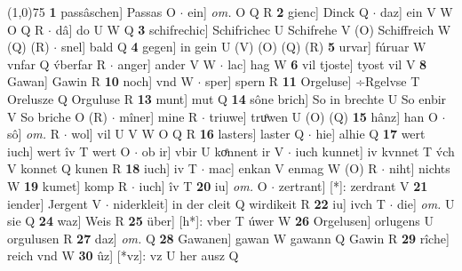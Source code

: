 \documentclass[8pt,a4paper,notitlepage]{article}
\begin{document}
\begin{table}[ht]
\begin{minipage}[t]{0.5\linewidth}
\line(1,0){75} \newline
\textbf{1} passâschen] Passas O  $\cdot$ ein] \textit{om.} O Q R \textbf{2} gienc] Dinck Q  $\cdot$ daz] ein V W O Q R  $\cdot$ dâ] do U W Q \textbf{3} schifrechic] Schifrichec U Schifrehe V (O) Schiffreich W (Q) (R)  $\cdot$ snel] bald Q \textbf{4} gegen] in gein U (V) (O) (Q) (R) \textbf{5} urvar] fúruar W vnfar Q v́berfar R  $\cdot$ anger] ander V W  $\cdot$ lac] hag W \textbf{6} vil tjoste] tyost vil V \textbf{8} Gawan] Gawin R \textbf{10} noch] vnd W  $\cdot$ sper] spern R \textbf{11} Orgeluse] ÷Rgelvse T Orelusze Q Orguluse R \textbf{13} munt] mut Q \textbf{14} sône brich] So in brechte U So enbir V So briche O (R)  $\cdot$ mîner] mine R  $\cdot$ triuwe] truͦwen U (O) (Q) \textbf{15} hânz] han O  $\cdot$ sô] \textit{om.} R  $\cdot$ wol] vil U V W O Q R \textbf{16} lasters] laster Q  $\cdot$ hie] alhie Q \textbf{17} wert iuch] wert îv T wert O  $\cdot$ ob ir] vbir U koͤnnent ir V  $\cdot$ iuch kunnet] iv kvnnet T v́ch V konnet Q kunen R \textbf{18} iuch] iv T  $\cdot$ mac] enkan V enmag W (O) R  $\cdot$ niht] nichts W \textbf{19} kumet] komp R  $\cdot$ iuch] îv T \textbf{20} iu] \textit{om.} O  $\cdot$ zertrant] [*]: zerdrant V \textbf{21} iender] Jergent V  $\cdot$ niderkleit] in der cleit Q wirdikeit R \textbf{22} iu] ivch T  $\cdot$ die] \textit{om.} U sie Q \textbf{24} waz] Weis R \textbf{25} über] [h*]: vber T úwer W \textbf{26} Orgelusen] orlugens U orgulusen R \textbf{27} daz] \textit{om.} Q \textbf{28} Gawanen] gawan W gawann Q Gawin R \textbf{29} rîche] reich vnd W \textbf{30} ûz] [*vz]: vz U her ausz Q \newline
\end{minipage}
\end{table}
\end{document}
